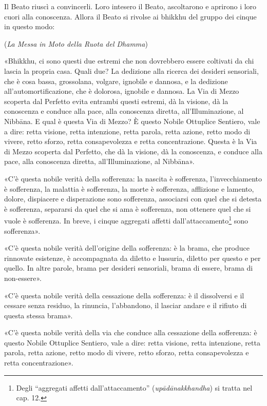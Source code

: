 
Il Beato riuscì a convincerli. Loro intesero il Beato, ascoltarono e aprirono i
loro cuori alla conoscenza. Allora il Beato si rivolse ai bhikkhu del gruppo dei
cinque in questo modo:

(\emph{La Messa in Moto della Ruota del Dhamma})

«Bhikkhu, ci sono questi due estremi che non dovrebbero essere coltivati da chi
lascia la propria casa. Quali due? La dedizione alla ricerca dei desideri
sensoriali, che è cosa bassa, grossolana, volgare, ignobile e dannosa, e la
dedizione all’automortificazione, che è dolorosa, ignobile e dannosa. La Via di
Mezzo scoperta dal Perfetto evita entrambi questi estremi, dà la visione, dà la
conoscenza e conduce alla pace, alla conoscenza diretta, all’Illuminazione, al
Nibbāna. E qual è questa Via di Mezzo? È questo Nobile Ottuplice Sentiero, vale
a dire: retta visione, retta intenzione, retta parola, retta azione, retto modo
di vivere, retto sforzo, retta consapevolezza e retta concentrazione. Questa è
la Via di Mezzo scoperta dal Perfetto, che dà la visione, dà la conoscenza, e
conduce alla pace, alla conoscenza diretta, all’Illuminazione, al Nibbāna».

«C’è questa nobile verità della sofferenza: la nascita è sofferenza,
l’invecchiamento è sofferenza, la malattia è sofferenza, la morte è sofferenza,
afflizione e lamento, dolore, dispiacere e disperazione sono sofferenza,
associarsi con quel che si detesta è sofferenza, separarsi da quel che si ama è
sofferenza, non ottenere quel che si vuole è sofferenza. In breve, i cinque
aggregati affetti dall’attaccamento\footnote{Degli “aggregati affetti
  dall’attaccamento” (\emph{upādānakkhandha}) si tratta nel cap. 12.} sono
sofferenza».

«C’è questa nobile verità dell’origine della sofferenza: è la brama, che produce
rinnovate esistenze, è accompagnata da diletto e lussuria, diletto per questo e
per quello. In altre parole, brama per desideri sensoriali, brama di essere,
brama di non-essere».

«C’è questa nobile verità della cessazione della sofferenza: è il dissolversi e
il cessare senza residuo, la rinuncia, l’abbandono, il lasciar andare e il
rifiuto di questa stessa brama».

«C’è questa nobile verità della via che conduce alla cessazione della
sofferenza: è questo Nobile Ottuplice Sentiero, vale a dire: retta visione,
retta intenzione, retta parola, retta azione, retto modo di vivere, retto
sforzo, retta consapevolezza e retta concentrazione».

